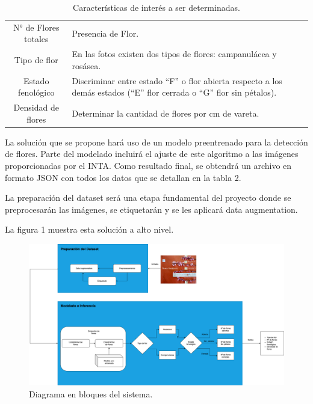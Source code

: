 \documentclass[
11pt, %
codirector, %
]{charter}
\begin{document}
\renewcommand{\tablename}{Tabla}
\begin{table}[ht]
\begin{center}
\begin{tabularx}{\textwidth}{| c | X | }
\hline
\rowcolor[HTML]{C0C0C0}
\multicolumn{2}{ |c| }{Características de interés a ser determinadas} \\ \hline

  N° de Flores totales  & Presencia de Flor. \\ \hline
  Tipo de flor          & En las fotos existen dos tipos de flores: campanulácea y rosásea. \\ \hline
  Estado fenológico     & Discriminar entre estado “F” o flor abierta respecto a los demás estados (“E” flor cerrada o “G” flor sin pétalos). \\ \hline
  Densidad de flores    & Determinar la cantidad de flores por cm de vareta. \\ \hline
  
\end{tabularx}
\caption{Características de interés a ser determinadas.}
\end{center}
\end{table}

La solución que se propone hará uso de un modelo preentrenado para la detección de flores. Parte del modelado incluirá el ajuste de este algoritmo a las imágenes proporcionadas por el INTA. Como resultado final, se obtendrá un archivo en formato JSON con todos los datos que se detallan en la tabla 2.

La preparación del dataset será una etapa fundamental del proyecto donde se preprocesarán las imágenes, se etiquetarán y se les aplicará data augmentation. 

La figura 1 muestra esta solución a alto nivel.

\begin{figure}[htpb]
\centering 
\includegraphics[width=1\textwidth]{./Figuras/Tesis3.drawio.png}
\caption{Diagrama en bloques del sistema.}
\label{fig:diagBloques}
\end{figure}
\end{document}
